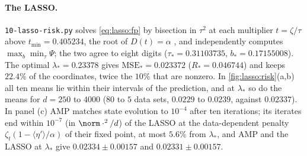 \begin{refsection}
\paragraph{The LASSO.} \texttt{10-lasso-risk.py} solves \eqref{eq:lasso:fp} by bisection in $\tau^2$ at each multiplier $t=\zeta/\tau$ above $t_{\min}=0.405234$, the root of $D(t)=\alpha$ \parencite[Proposition~1.3]{BayatiMontanari2012}, and independently computes $\max_b\min_\tau\Psi$; the two agree to eight digits ($\tau_*=0.31103735$, $b_*=0.17155008$). The optimal $\lambda_*=0.23378$ gives $\mathrm{MSE}_*=0.023372$ ($R_*=0.046744$) and keeps $22.4\%$ of the coordinates, twice the $10\%$ that are nonzero. In \cref{fig:lasso:risk}(a,b) all ten means lie within their intervals of the prediction, and at $\lambda_*$ so do the means for $d=250$ to $4000$ ($80$ to $5$ data sets, $0.0229$ to $0.0239$, against $0.02337$). In panel (c) AMP matches state evolution to $10^{-4}$ after ten iterations; its iterates end within $10^{-7}$ (in $\norm\cdot^2/d$) of the LASSO at the data-dependent penalty $\zeta_t(1-\langle\eta'\rangle/\alpha)$ of their fixed point, at most $5.6\%$ from $\lambda_*$, and AMP and the LASSO at $\lambda_*$ give $0.02334\pm0.00157$ and $0.02331\pm0.00157$.


\end{refsection}
